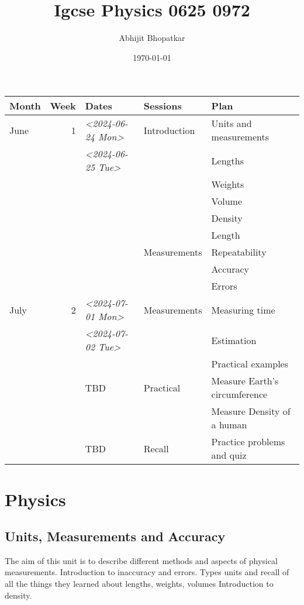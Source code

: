 \documentclass[11pt]{article}
\author{Abhijit Bhopatkar}
\date{\today}
\title{Igcse Physics 0625 0972}
\begin{document}
\maketitle
\tableofcontents

\begin{center}
\begin{tabular}{lrlll}
\hline
Month & Week & Dates & Sessions & Plan\\[0pt]
\hline
June & 1 & \textit{<2024-06-24 Mon>} & Introduction & Units and measurements\\[0pt]
 &  & \textit{<2024-06-25 Tue>} &  & Lengths\\[0pt]
 &  &  &  & Weights\\[0pt]
 &  &  &  & Volume\\[0pt]
 &  &  &  & Density\\[0pt]
 &  &  &  & Length\\[0pt]
 &  &  & Measurements & Repeatability\\[0pt]
 &  &  &  & Accuracy\\[0pt]
 &  &  &  & Errors\\[0pt]
\hline
July & 2 & \textit{<2024-07-01 Mon>} & Measurements & Measuring time\\[0pt]
 &  & \textit{<2024-07-02 Tue>} &  & Estimation\\[0pt]
 &  &  &  & Practical examples\\[0pt]
\hline
 &  & TBD & Practical & Measure Earth's circumference\\[0pt]
 &  &  &  & Measure Density of a human\\[0pt]
\hline
 &  & TBD & Recall & Practice problems and quiz\\[0pt]
\hline
\end{tabular}
\end{center}


\section{Physics}
\label{sec:org828abb6}
\subsection{Units, Measurements and Accuracy}
\label{sec:org4b2d193}
The aim of this unit is to describe different methods and aspects of physical measurements.
Introduction to inaccuracy and errors. Types units and recall of all the things they learned about lengths, weights, volumes
Introduction to density.
\end{document}
